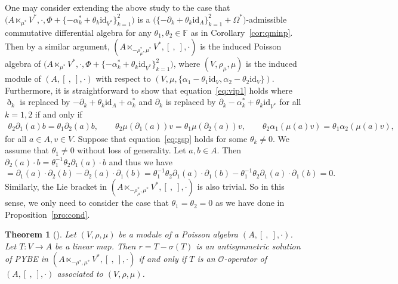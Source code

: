 \documentclass[pdftex]{sigma}
\numberwithin{equation}{section}
\newtheorem{Theorem}{Theorem}[section]
\newcommand{\id}{\mathrm{id}}
\begin{document}
\begin{Remark}One may consider extending the above study to the case that
$\big(A \ltimes_{\mu^*} V^*, \cdot, \Phi + \{-\alpha_k^* + \theta_k\id_{V^*}\}_{k=1}^2\big)$ is a $\big(\{-\partial_k + \theta_k \id_A\}_{k=1}^2 + \Omega^*\big)$-admissible commutative differential algebra for any $\theta_1,\theta_2\in \mathbb F$ as in Corollary~\ref{cor:qminp}.
Then by a similar argument,
$(A \ltimes_{-\rho_\mu^*, \mu^*} V^*, [\ ,\ ], \cdot)$ is the induced Poisson algebra of $\big(A \ltimes_{\mu^*} V^*, \cdot, \Phi+\{-\alpha_k^* + \theta_k\id_{V^*}\}_{k=1}^2\big)$,
where $(V, \rho_\mu, \mu)$ is the induced module of $(A, [\ ,\ ], \cdot)$ with respect to $(V, \mu, \{\alpha_1 - \theta_1 \id_V, \alpha_2 - \theta_2 \id_V \})$.
Furthermore, it is straightforward to show that equation~\eqref{eq:vip1} holds
where $\eth_k$ is replaced by $-\partial_k + \theta_k \id_{A} + \alpha_k^*$ and $\partial_k$ is replaced by $\partial_k - \alpha_k^* + \theta_k \id_{V^*}$ for all $k = 1, 2$
if and only if
\begin{gather}
 \theta_2 \partial_1(a)b = \theta_1 \partial_2(a)b, \qquad\!
 \theta_2 \mu(\partial_1(a))v = \theta_1\mu(\partial_2(a))v, \qquad\!
 \theta_2 \alpha_1(\mu(a)v) = \theta_1 \alpha_2(\mu(a)v),\!\!\!\! \label{eq:gsp}
\end{gather}
for all $a \in A, v \in V$.
Suppose that equation~\eqref{eq:gsp} holds for some $\theta_k \neq 0$.
We assume that $\theta_1 \neq 0$ without loss of generality.
Let $a, b \in A$.
Then $\partial_2(a) \cdot b = \theta_1^{-1} \theta_2 \partial_1(a) \cdot b$ and thus we have
\begin{equation*}
 [a, b] = \partial_1(a) \cdot \partial_2(b) - \partial_2(a) \cdot
 \partial_1(b)
 = \theta_1^{-1} \theta_2 \partial_1(a) \cdot \partial_1(b) - \theta_1^{-1} \theta_2 \partial_1(a) \cdot \partial_1(b) = 0.
\end{equation*}
Similarly, the Lie bracket in $(A \ltimes_{-\rho_\mu^*, \mu^*} V^*, [\ ,\ ], \cdot)$ is also trivial.
So in this sense, we only need to consider the case that $\theta_1 = \theta_2 = 0$ as we have done in Proposition~\ref{pro:cond}.
\end{Remark}

\begin{Theorem}[{\cite[Theorem~5.24]{liu2020noncommutative}}]\label{thm:oopsemi}
Let $(V, \rho, \mu)$ be a module of a Poisson algebra $(A, [\ ,\ ], \cdot)$.
 Let $T\colon V \to A$ be a linear map. Then $r = T - \sigma(T)$ is an antisymmetric solution of PYBE in $(A \ltimes_{-\rho^*, \mu^*} V^*, [\ ,\ ], \cdot)$ if and only if
 $T$ is an $\mathcal{O}$-operator of $(A, [\ ,\ ], \cdot)$ associated to $(V, \rho, \mu)$.
\end{Theorem}
\end{document}
